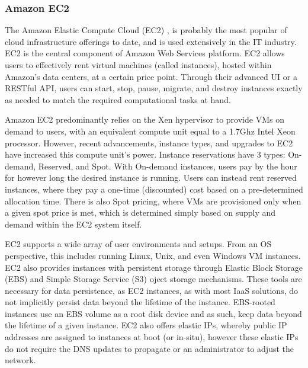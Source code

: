 
\subsubsection{Amazon EC2}


 The Amazon Elastic Compute Cloud (EC2) \cite{EC2}, is probably the most popular of cloud infrastructure offerings to date, and is used extensively in the IT industry. EC2 is the central component of Amazon Web Services platform. EC2 allows users to effectively rent virtual machines (called instances), hosted within Amazon's data centers, at a certain price point. Through their advanced UI or a RESTful API, users can start, stop, pause, migrate, and destroy instances exactly as needed to match the required computational tasks at hand.   

Amazon EC2 predominantly relies on the Xen hypervisor to provide VMs on demand to users, with an equivalent compute unit equal to a 1.7Ghz Intel Xeon processor.  However, recent advancements, instance types, and upgrades to EC2 have increased this compute unit's power. Instance reservations have 3 types: On-demand, Reserved, and Spot. With On-demand instances, users pay by the hour for however long the desired instance is running. Users can instead rent reserved instances, where they pay a one-time (discounted) cost based on a pre-determined allocation time. There is also Spot pricing, where VMs are provisioned only when a given spot price is met, which is determined simply based on supply and demand within the EC2 system itself. 

EC2 supports a wide array of user environments and setups. From an OS perspective, this includes running Linux, Unix, and even Windows VM instances. EC2 also provides instances with persistent storage through Elastic Block Storage (EBS) and Simple Storage Service (S3) oject storage mechanisms. These tools are necessary for data persistence, as EC2 instances, as with most IaaS solutions, do not implicitly persist data beyond the lifetime of the instance. EBS-rooted instances use an EBS volume as a root disk device and as such, keep data beyond the lifetime of a given instance. EC2 also offers elastic IPs, whereby public IP addresses are assigned to instances at boot (or in-situ), however these elastic IPs do not require the DNS updates to propagate or an administrator to adjust the network.  

